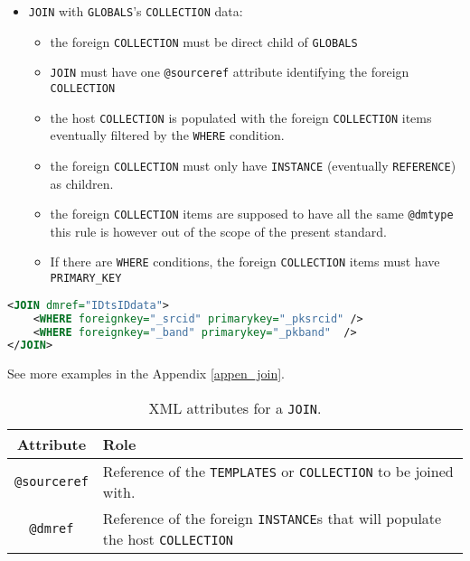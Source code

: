 \begin{itemize}
   \item \texttt{JOIN}  with \texttt{GLOBALS}'s \texttt{COLLECTION} data:
       \begin{itemize}
         \item the foreign \texttt{COLLECTION} must be direct child of \texttt{GLOBALS} 
         \item \texttt{JOIN} must have one \texttt{@sourceref} attribute identifying the foreign \texttt{COLLECTION} 
         \item the host \texttt{COLLECTION} is populated with the foreign \texttt{COLLECTION} items eventually filtered by the \texttt{WHERE} condition.
         \item the foreign \texttt{COLLECTION} must only have \texttt{INSTANCE}  (eventually \texttt{REFERENCE}) as children.
         \item the foreign \texttt{COLLECTION} items are supposed to have all the same \texttt{@dmtype}  this rule is however out of the scope of the present standard.
         \item If there are \texttt{WHERE} conditions, the foreign \texttt{COLLECTION} items must have \texttt{PRIMARY\_KEY} 
  \end{itemize}
\end{itemize}

\begin{lstlisting}[label={lst:join},caption={\texttt{JOIN example with 2 join conditions (see line~\ref{JOIN_snippet} in Appendix A).} },language=XML]
<JOIN dmref="IDtsIDdata">
    <WHERE foreignkey="_srcid" primarykey="_pksrcid" />
    <WHERE foreignkey="_band" primarykey="_pkband"  />
</JOIN>
\end{lstlisting}

See more examples in the Appendix \ref{appen_join}. 
\begin{table}[!htbp]
\small
\centering
\begin{tabulary}{\linewidth}{|c|J|}       
       \hline 
            \textbf{Attribute} & 
            \textbf {Role}\\
       \hline         \hline  
             \texttt{@sourceref} & 
            Reference of the \texttt{TEMPLATES} or \texttt{COLLECTION} to be joined with. \\
        \hline 
            \texttt{@dmref} & 
            Reference of the foreign \texttt{INSTANCE}s that will populate the host \texttt{COLLECTION}  \\
        \hline 
     \end{tabulary}
     \caption{XML attributes for a \texttt{JOIN}.} 
     \label{tbl:join-att}
 \end{table}

